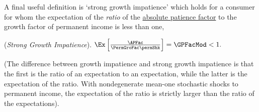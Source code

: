 \documentclass[BufferStockTheory]{subfiles}
\begin{document}
\begin{comment}
\begin{verbatimwrite}{Equations/GICRaw}
  \begin{equation}\begin{gathered}\begin{aligned}
        \text{\GICRaw:~~}  &&  \GPFacRaw  < 1 . \phantom{/\PermGroFac}&  \phantom{\text{\GICRaw:~~}} \label{eq:GICRaw}
      \end{aligned}\end{gathered}\end{equation}
\end{verbatimwrite}

\end{assumS}
\end{comment}

A final useful definition is `strong growth impatience' which holds for a consumer for whom the expectation of the \textit{ratio} of the \hyperlink{APFAC}{absolute patience factor} to the growth factor of permanent income is less than one, 
\hypertarget{GICMod}{}
\begin{assumS}(\textit{Strong Growth Impatience}). \label{ass:GICMod}
$ \Ex\left[\frac{\APFac}{\PermGroFac \permShk}\right] = \GPFacMod  < 1.$
\end{assumS}

(The difference between growth impatience and strong growth impatience is that the first is the ratio of an expectation to an expectation, while the latter is the expectation of the ratio.
With nondegenerate mean-one stochastic shocks to permanent income, the expectation of the ratio is strictly larger than the ratio of the expectations).

\begin{comment}
\begin{verbatimwrite}{Equations/GICMod}
  \begin{align}
    \text{{\GICMod}:~~}    \GPFacMod  & < 1 .  \phantom{\text{{\GICMod}:~~}}\label{eq:GICMod}
  \end{align}\end{verbatimwrite}

\end{comment}
\end{document}
